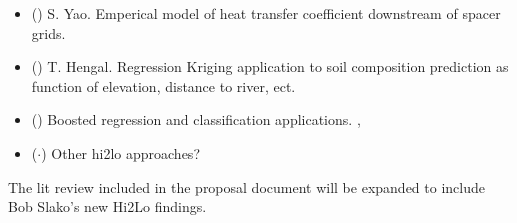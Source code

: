 \begin{itemize}
    \item (\checkmark) S. Yao.  Emperical model of heat transfer coefficient downstream of spacer grids. \cite{yao82}
    \item (\checkmark) T. Hengal. Regression Kriging application to soil composition prediction as function of elevation, distance to river, ect. \cite{Hengl07}
    \item (\checkmark) Boosted regression and classification applications. \cite{moisen2006}, \cite{friedman2002}
    \item ($\cdot$) Other hi2lo approaches?
\end{itemize}

The lit review included in the proposal document will be expanded to include Bob Slako's new Hi2Lo findings.
